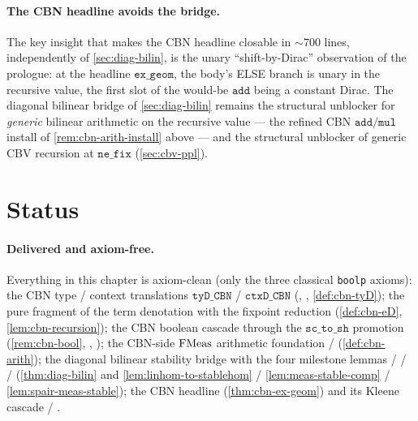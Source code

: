 \paragraph{The CBN headline avoids the bridge.}
The key insight that makes the CBN headline closable in $\sim 700$
lines, independently of \autoref{sec:diag-bilin}, is the unary
``shift-by-Dirac'' observation of the prologue: at the headline
$\mathtt{ex\_geom}$, the body's ELSE branch is unary in the recursive
value, the first slot of the would-be $\mathtt{add}$ being a constant
Dirac. The diagonal bilinear bridge of \autoref{sec:diag-bilin}
remains the structural unblocker for \emph{generic} bilinear
arithmetic on the recursive value --- the refined CBN
$\mathtt{add}/\mathtt{mul}$ install of
\autoref{rem:cbn-arith-install} above --- and the structural unblocker
of generic CBV recursion at $\mathtt{ne\_fix}$
(\autoref{sec:cbv-ppl}).

\section{Status}\label{sec:cbn-status}

\paragraph{Delivered and axiom-free.}
Everything in this chapter is axiom-clean (only the three classical
\texttt{boolp} axioms): the CBN type / context translations
$\mathtt{tyD\_CBN}$ / $\mathtt{ctxD\_CBN}$
(,
,
\autoref{def:cbn-tyD}); the pure fragment of the term denotation
 with the fixpoint reduction
(\autoref{def:cbn-eD}, \autoref{lem:cbn-recursion}); the CBN
boolean cascade through the $\texttt{sc\_to\_sh}$ promotion
(\autoref{rem:cbn-bool},
,
); the CBN-side
$\mathrm{FMeas}$ arithmetic foundation
 /
 (\autoref{def:cbn-arith});
the diagonal bilinear stability bridge
with the four milestone lemmas
/
 /
 /
(\autoref{thm:diag-bilin} and \autoref{lem:linhom-to-stablehom} /
\autoref{lem:meas-stable-comp} / \autoref{lem:spair-meas-stable});
the CBN headline
(\autoref{thm:cbn-ex-geom}) and its Kleene cascade
 /
.

